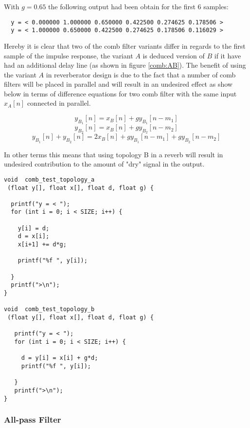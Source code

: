 \documentclass[12pt]{report}
\begin{document}
  With $g=0.65$ the following output had been obtain for the first 6 samples:
  \begin{verbatim}
  y = < 0.000000 1.000000 0.650000 0.422500 0.274625 0.178506 >
  y = < 1.000000 0.650000 0.422500 0.274625 0.178506 0.116029 >
  \end{verbatim}
  Hereby it is clear that two of the comb filter variants differ in regards to
  the first sample of the impulse response, the variant $A$ is deduced version of
  $B$ if it have had an additional delay line (as shown in figure \ref{comb:AB}).
  The benefit of using the variant $A$ in reverberator design is due to the fact
  that a number of comb filters will be placed in parallel and will result in an
  undesired effect as show below in terms of difference equations for two comb
  filter with the same input $x_A[n]$ connected in parallel.

  \[ y_{B_1}[n] = x_B[n] + gy_{B_1}[n-m_1] \]
  \[ y_{B_2}[n] = x_B[n] + gy_{B_2}[n-m_2] \]
  \[ y_{B_1}[n] + y_{B_2}[n] = 2x_{B}[n] + gy_{B_1}[n-m_1] + gy_{B_2}[n-m_2] \]

  In other terms this means that using topology B in a reverb will result in
  undesired contribution to the amount of "dry" signal in the output.

  \vspace{2em}

\begin{lstlisting}
void  comb_test_topology_a
 (float y[], float x[], float d, float g) {

  printf("y = < ");
  for (int i = 0; i < SIZE; i++) {
  
    y[i] = d;
    d = x[i];
    x[i+1] += d*g;
  
    printf("%f ", y[i]);
  
  }
  printf(">\n");
}

void  comb_test_topology_b
 (float y[], float x[], float d, float g) {

   printf("y = < ");
   for (int i = 0; i < SIZE; i++) {

     d = y[i] = x[i] + g*d;
     printf("%f ", y[i]);

   }
   printf(">\n");
}

\end{lstlisting}


  

  \subsubsection{All-pass Filter}
  



%
%


\end{document}
